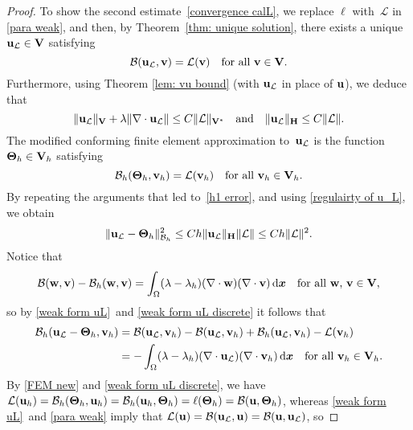 \documentclass[11pt]{article}
\newcommand{\calB}{\mathcal{B}}
\newcommand{\calL}{\mathcal{L}}
\newcommand{\vu}{{\bf u}}
\newcommand{\vv}{{\bf v}}
\newcommand{\vV}{{\bf V}}
\newcommand{\vw}{{\bf w}}
\newcommand{\bsx}{{\boldsymbol{x}}}
\numberwithin{equation}{section}
\newcommand{\ud}{\mathrm{d}}
\begin{document}
\begin{proof}
To show the second estimate~\eqref{convergence calL}, we replace $\ell$
with~$\calL$ in \eqref{para weak}, and then, by
Theorem~\ref{thm: unique solution}, there exists a unique~$\vu_{\calL} \in \vV$ satisfying
\begin{equation}\label{weak form uL}
\calB(\vu_{\calL}, \vv) = \calL(\vv)\quad\text{for all $\vv \in \vV$.}
\end{equation}
Furthermore, using  Theorem \ref{lem: vu bound} (with $\vu_{\calL}$ in place of $\vu$), we deduce that  
\begin{equation}\label{regulairty of u_L}
    \|\vu_{\calL}\|_{\vV}+\lambda\|\nabla\cdot \vu_{\calL}\| \le C\|\calL\|_{\vV^*}\quad{\rm and}\quad 
\|\vu_{\calL}\|_{\bf H}\le C\|\calL\|.
\end{equation}
The modified conforming finite element approximation to~$\vu_{\calL}$ is the
function~$\mathbf{\Theta}_h\in\vV_h$ satisfying
\begin{equation}\label{weak form uL discrete}
\calB_h(\mathbf{\Theta}_h,\vv_h) = \calL(\vv_h)
\quad\text{for all $\vv_h \in\vV_h$.}
\end{equation}
By repeating the arguments that led to~\eqref{h1 error}, and using
\eqref{regulairty of u_L}, we obtain
\begin{equation}\label{projection estimate ucalL}
\|\vu_{\calL}-{\bf\Theta}_h\|_{\calB_h}^2
    \le Ch\|\vu_{\calL}\|_{\mathbf{H}}\|\calL\|\le Ch\|\calL\|^2.
\end{equation}
Notice that
\[
\calB(\vw,\vv)-\calB_h(\vw,\vv)
    =\int_\Omega (\lambda-\lambda_h)(\nabla\cdot\vw)(\nabla\cdot\vv)\,\ud\bsx
    \quad\text{for all $\vw$, $\vv\in\vV$,}
\]
so by \eqref{weak form uL}~and \eqref{weak form uL discrete} it follows that
\begin{equation}\label{uL relation}
\begin{aligned}
\calB_h(\vu_{\calL}-{\bf\Theta}_h,\vv_h)&=\calB(\vu_{\calL},\vv_h)
   -\calB(\vu_{\calL},\vv_h)+\calB_h(\vu_{\calL},\vv_h)-\calL(\vv_h)\\
   &=-\int_{\Omega}(\lambda-\lambda_h)
    (\nabla\cdot\vu_{\calL})(\nabla\cdot\vv_h)\,\ud\bsx
    \quad\text{for all $\vv_h \in\vV_h$.}
\end{aligned}
\end{equation}
By \eqref{FEM new} and \eqref{weak form uL discrete}, we have 
$\calL(\vu_h)=\calB_h(\mathbf{\Theta}_h,\vu_h)
=\calB_h(\vu_h,\mathbf{\Theta}_h)=\ell(\mathbf{\Theta}_h)
=\calB(\vu,\mathbf{\Theta}_h)$, whereas \eqref{weak form uL}~and \eqref{para
weak} imply that $\calL(\vu)=\calB(\vu_{\calL},\vu)=\calB(\vu,\vu_{\calL})$, so

\end{proof}
\end{document}
